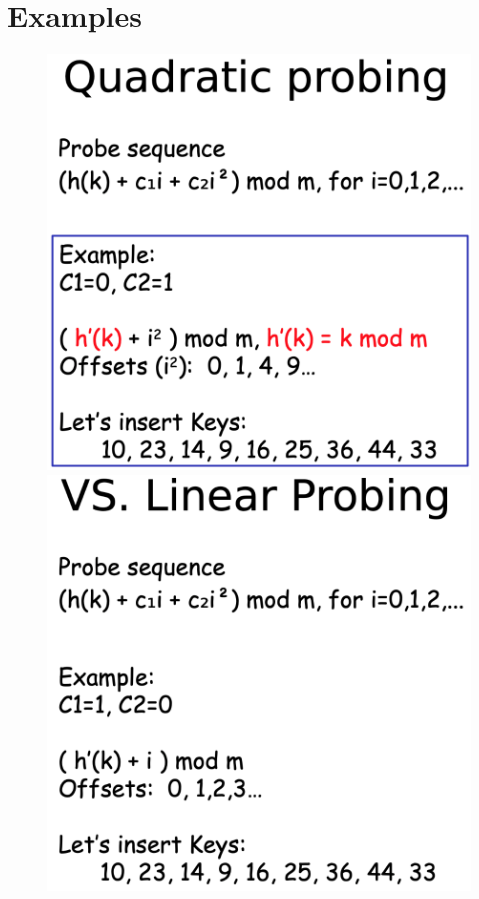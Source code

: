 \documentclass[12pt]{book}
\begin{document}
\section*{Examples}
\begin{figure}[h]
        \centering
        \includegraphics[scale=0.3]{./figures/ex1}
        \includegraphics[scale=0.3]{./figures/ex2}
\end{figure}
\end{document}
